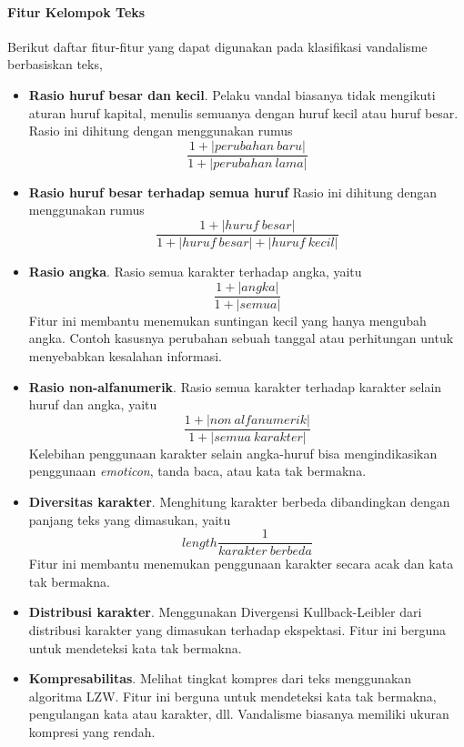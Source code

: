 \documentclass[12pt,a4paper,titlepage]{article}
\begin{document}
\paragraph{Fitur Kelompok Teks}

Berikut daftar fitur-fitur yang dapat digunakan pada klasifikasi vandalisme berbasiskan teks,

\begin{itemize}

\item \textbf{Rasio huruf besar dan kecil}.
Pelaku vandal biasanya tidak mengikuti aturan huruf kapital, menulis semuanya dengan huruf kecil atau huruf besar.
Rasio ini dihitung dengan menggunakan rumus
\[
\frac{1 + |perubahan\ baru|}{1 + |perubahan\ lama|}
\]

\item \textbf{Rasio huruf besar terhadap semua huruf}
Rasio ini dihitung dengan menggunakan rumus
\[
\frac{1 + |huruf\ besar|}{1 + |huruf\ besar| + |huruf\ kecil|}
\]

\item \textbf{Rasio angka}.
Rasio semua karakter terhadap angka, yaitu
\[
\frac{1 + |angka|}{1 + |semua|}
\]
Fitur ini membantu menemukan suntingan kecil yang hanya mengubah angka.
Contoh kasusnya perubahan sebuah tanggal atau perhitungan untuk menyebabkan kesalahan informasi.

\item \textbf{Rasio non-alfanumerik}.
Rasio semua karakter terhadap karakter selain huruf dan angka, yaitu
\[
\frac{1 + |non\ alfanumerik|}{1 + |semua\ karakter|}
\]
Kelebihan penggunaan karakter selain angka-huruf bisa mengindikasikan penggunaan \textit{emoticon}, tanda baca, atau kata tak bermakna.

\item \textbf{Diversitas karakter}.
Menghitung karakter berbeda dibandingkan dengan panjang teks yang dimasukan, yaitu
\[
length \frac{1}{karakter\ berbeda}
\]
Fitur ini membantu menemukan penggunaan karakter secara acak dan kata tak bermakna.

\item \textbf{Distribusi karakter}.
Menggunakan Divergensi Kullback-Leibler dari distribusi karakter yang dimasukan terhadap ekspektasi.
Fitur ini berguna untuk mendeteksi kata tak bermakna.

\item \textbf{Kompresabilitas}.
Melihat tingkat kompres dari teks menggunakan algoritma LZW.
Fitur ini berguna untuk mendeteksi kata tak bermakna, pengulangan kata atau karakter, dll.
Vandalisme biasanya memiliki ukuran kompresi yang rendah.


\end{itemize}
\end{document}
